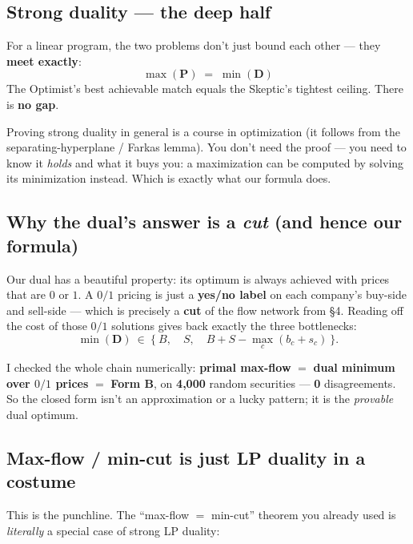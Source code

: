 \subsection{Strong duality --- the deep half}

\begin{keybox}
For a linear program, the two problems don't just bound each other --- they
\textbf{meet exactly}:
\[
\boxed{\ \max(\textbf{P}) \;=\; \min(\textbf{D})\ }
\]
The Optimist's best achievable match equals the Skeptic's tightest ceiling. There
is \textbf{no gap}.
\end{keybox}

Proving strong duality in general is a course in optimization (it follows from the
separating-hyperplane / Farkas lemma). You don't need the proof --- you need to
know it \emph{holds} and what it buys you: a maximization can be computed by
solving its minimization instead. Which is exactly what our formula does.

\subsection{Why the dual's answer is a \emph{cut} (and hence our formula)}

Our dual has a beautiful property: its optimum is always achieved with prices that
are $0$ or $1$. A $0/1$ pricing is just a \textbf{yes/no label} on each company's
buy-side and sell-side --- which is precisely a \textbf{cut} of the flow network
from \S4. Reading off the cost of those $0/1$ solutions gives back exactly the
three bottlenecks:
\[
\min(\textbf{D})\ \in\ \Big\{\ B,\quad S,\quad B+S-\max_c(b_c+s_c)\ \Big\}.
\]

\begin{keybox}
I checked the whole chain numerically: \textbf{primal max-flow} $=$ \textbf{dual
minimum over $0/1$ prices} $=$ \textbf{Form B}, on \textbf{4{,}000} random
securities --- \textbf{0} disagreements. So the closed form isn't an approximation
or a lucky pattern; it is the \emph{provable} dual optimum.
\end{keybox}

\subsection{Max-flow / min-cut is just LP duality in a costume}

This is the punchline. The ``max-flow $=$ min-cut'' theorem you already used is
\emph{literally} a special case of strong LP duality:

